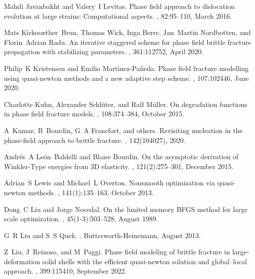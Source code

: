 \documentclass[10pt]{article}
\begin{document}
\begin{thebibliography}{10}
Mahdi Javanbakht and Valery~I Levitas.
\newblock Phase field approach to dislocation evolution at large strains: Computational aspects.
, 82:95--110, March 2016.

Mats Kirkes{\ae}ther~Brun, Thomas Wick, Inga Berre, Jan~Martin Nordbotten, and Florin~Adrian Radu.
\newblock An iterative staggered scheme for phase field brittle fracture propagation with stabilizing parameters.
, 361:112752, April 2020.

Philip~K Kristensen and Emilio Mart{\'\i}nez-Pa{\~n}eda.
\newblock Phase field fracture modelling using quasi-newton methods and a new adaptive step scheme.
, 107:102446, June 2020.

Charlotte Kuhn, Alexander Schl{\"u}ter, and Ralf M{\"u}ller.
\newblock On degradation functions in phase field fracture models.
, 108:374--384, October 2015.

A~Kumar, B~Bourdin, G~A Francfort, and {others}.
\newblock Revisiting nucleation in the phase-field approach to brittle fracture.
, 142(104027), 2020.

Andr{\'e}s~A Le{\'o}n~Baldelli and Blaise Bourdin.
\newblock On the asymptotic derivation of {Winkler-Type} energies from {3D} elasticity.
, 121(2):275--301, December 2015.

Adrian~S Lewis and Michael~L Overton.
\newblock Nonsmooth optimization via quasi-newton methods.
, 141(1):135--163, October 2013.

Dong~C Liu and Jorge Nocedal.
\newblock On the limited memory {BFGS} method for large scale optimization.
, 45(1-3):503--528, August 1989.

G~R Liu and S~S Quek.
.
\newblock Butterworth-Heinemann, August 2013.

Z~Liu, J~Reinoso, and M~Paggi.
\newblock Phase field modeling of brittle fracture in large-deformation solid shells with the efficient quasi-newton solution and global--local approach.
, 399:115410, September 2022.


\end{thebibliography}
\end{document}

